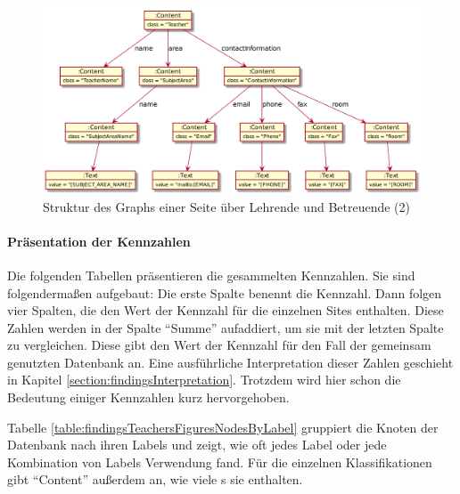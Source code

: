     \begin{figure}[htb]
        \centering
        \includegraphics[scale=\imageScalingFactor]{../resources/findings/case-study-1/dbmodel/dbmodel2.png}
        \caption{Struktur des Graphs einer Seite über Lehrende und Betreuende (2)}
        \label{image:findingTeachersFiguresDbModel2}
    \end{figure}

    \paragraph{Präsentation der Kennzahlen}
    Die folgenden Tabellen präsentieren die gesammelten Kennzahlen.
    Sie sind folgendermaßen aufgebaut:
    Die erste Spalte benennt die Kennzahl.
    Dann folgen vier Spalten, die den Wert der Kennzahl für die einzelnen Sites enthalten.
    Diese Zahlen werden in der Spalte "`Summe"' aufaddiert,
    um sie mit der letzten Spalte zu vergleichen.
    Diese gibt den Wert der Kennzahl für den Fall der gemeinsam genutzten Datenbank an.
    Eine ausführliche Interpretation dieser Zahlen geschieht in Kapitel \ref{section:findingsInterpretation}.
    Trotzdem wird hier schon die Bedeutung einiger Kennzahlen kurz hervorgehoben.

    Tabelle \ref{table:findingsTeachersFiguresNodesByLabel}
    gruppiert die Knoten der Datenbank nach ihren Labels und zeigt,
    wie oft jedes Label oder jede Kombination von Labels Verwendung fand.   
    Für die einzelnen Klassifikationen gibt "`Content"' außerdem an,
    wie viele {\contentFeature}s sie enthalten.

